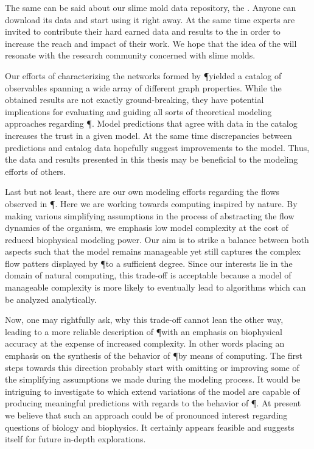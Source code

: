 	The same can be said about our slime mold data repository, the \SMGR. Anyone can download its data and start using it right away. At the same time experts are invited to contribute their hard earned data and results to the \SMGR in order to increase the reach and impact of their work. We hope that the idea of the \SMGR will resonate with the research community concerned with slime molds.

	Our efforts of characterizing the networks formed by \P yielded a catalog of observables spanning a wide array of different graph properties. While the obtained results are not exactly ground-breaking, they have potential implications for evaluating and guiding all sorts of theoretical modeling approaches regarding \P. Model predictions that agree with data in the catalog increases the trust in a given model. At the same time discrepancies between predictions and catalog data hopefully suggest improvements to the model. Thus, the data and results presented in this thesis may be beneficial to the modeling efforts of others.

	Last but not least, there are our own modeling efforts regarding the flows observed in \P. Here we are working towards computing inspired by nature. By making various simplifying assumptions in the process of abstracting the flow dynamics of the organism, we emphasis low model complexity at the cost of reduced biophysical modeling power. Our aim is to strike a balance between both aspects such that the model remains manageable yet still captures the complex flow patters displayed by \P to a sufficient degree. Since our interests lie in the domain of natural computing, this trade-off is acceptable because a model of manageable complexity is more likely to eventually lead to algorithms which can be analyzed analytically. 

	Now, one may rightfully ask, why this trade-off cannot lean the other way, leading to a more reliable description of \P with an emphasis on biophysical accuracy at the expense of increased complexity. In other words placing an emphasis on the synthesis of the behavior of \P by means of computing. The first steps towards this direction probably start with omitting or improving some of the simplifying assumptions we made during the modeling process. It would be intriguing to investigate to which extend variations of the model are capable of producing meaningful predictions with regards to the behavior of \P. At present we believe that such an approach could be of pronounced interest regarding questions of biology and biophysics. It certainly appears feasible and suggests itself for future in-depth explorations.

